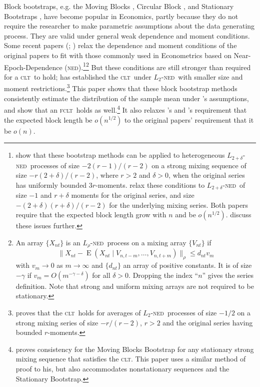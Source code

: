 \documentclass[11pt]{article}
\newcommand\citepos[2][]{\citeauthor{#2}'s \citeyearpar[#1]{#2}}
\theoremstyle{definition}
\DeclareMathOperator{\E}{E}
\newcommand{\clt}{\textsc{clt}}
\newcommand{\fclt}{\textsc{fclt}}
\newcommand{\ned}{\textsc{ned}}
\begin{document}
\newpage
\noindent Block bootstraps, e.g. the Moving Blocks
\citep{Kun:89,LiS:92}, Circular Block \citep{PoR:92}, and Stationary
Bootstraps \citep{PoR:94}, have become popular in Economics, partly
because they do not require the researcher to make parametric
assumptions about the data generating process.  They are valid under
general weak dependence and moment conditions.  Some recent papers
(\citealp{GoW:02}; \citealp{GoJ:03}) relax the dependence and moment
conditions of the original papers to fit with those commonly used in
Econometrics based on Near-Epoch-Dependence
(\ned).\footnote{\citet{GoW:02} show that these bootstrap methods can
  be applied to heterogeneous $L_{2+\delta}$-\ned\ processes of size
  $-2(r-1)/(r-2)$ on a strong mixing sequence of size
  $-r(2+\delta)/(r-2)$, where $r > 2$ and $\delta >0$, when the
  original series has uniformly bounded $3r$-moments.  \citet{GoJ:03}
  relax these conditions to $L_{2+\delta}$-\ned\ of size $-1$ and
  $r+\delta$ moments for the original series, and size
  $-(2+\delta)(r+\delta)/(r-2)$ for the underlying mixing series.
  Both papers require that the expected block length grow with $n$ and
  be $o(n^{1/2})$.  \cite{GoP:11} discuss these issues
  further.}\footnote{An array $\{X_{nt}\}$ is an $L_{\rho}$-\ned\
  process on a mixing array $\{V_{nt}\}$ if
  \begin{equation}
    \| X_{nt} - \E(X_{nt}
    \mid V_{n,t-m},\dots,V_{n,t+m}) \|_{\rho} \leq d_{nt} v_m
  \end{equation} 
  with $v_m \to 0$ as $m \to \infty$ and $\{d_{nt}\}$ an array of
  positive constants.  It is of size $-\gamma$ if $v_m = O(m^{-\gamma
    - \delta})$ for all $\delta>0$.  Dropping the index ``$n$'' gives
  the series definition.  Note that strong and uniform mixing arrays are
  not required to be stationary.} But these conditions are still stronger than
required for a \clt\ to hold; \citet{Jon:97} has established the \clt\
under $L_2$-\ned\ with smaller size and moment
restrictions.\footnote{\citet{Jon:97} proves that the \clt\ holds for
  averages of $L_2$-\ned\ processes of size $-1/2$ on a strong mixing
  series of size $-r/(r-2)$, $r > 2$ and the original series having
  bounded $r$-moments.}  This paper shows that these block bootstrap
methods consistently estimate the distribution of the sample mean
under \citepos{Jon:97} assumptions, and show that an \fclt\ holds as
well.\footnote{\citet{Rad:96} proves consistency for the Moving Blocks
  Bootstrap for any stationary strong mixing sequence that satisfies
  the \clt. This paper uses a similar method of proof to his, but also
  accommodates nonstationary sequences and the Stationary Bootstrap.}
It also relaxes \citepos{GoW:02} and \citepos{GoJ:03} requirement that
the expected block length be $o(n^{1/2})$ to the original papers'
requirement that it be $o(n)$.
\end{document}
